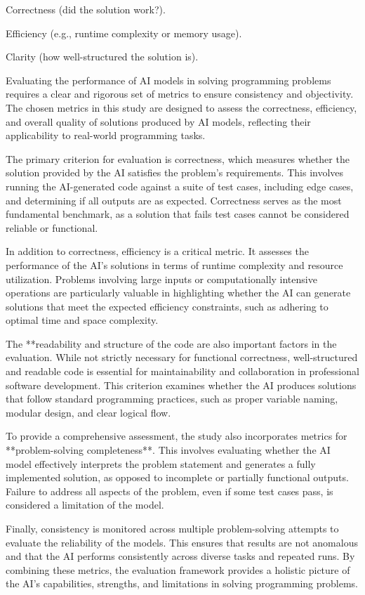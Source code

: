     Correctness (did the solution work?).

    Efficiency (e.g., runtime complexity or memory usage).

    Clarity (how well-structured the solution is).



Evaluating the performance of AI models in solving programming problems requires a clear and rigorous set of metrics to ensure consistency and objectivity. The chosen metrics in this study are designed to assess the correctness, efficiency, and overall quality of solutions produced by AI models, reflecting their applicability to real-world programming tasks.
    
The primary criterion for evaluation is correctness, which measures whether the solution provided by the AI satisfies the problem’s requirements. This involves running the AI-generated code against a suite of test cases, including edge cases, and determining if all outputs are as expected. Correctness serves as the most fundamental benchmark, as a solution that fails test cases cannot be considered reliable or functional.
    
In addition to correctness, efficiency is a critical metric. It assesses the performance of the AI’s solutions in terms of runtime complexity and resource utilization. Problems involving large inputs or computationally intensive operations are particularly valuable in highlighting whether the AI can generate solutions that meet the expected efficiency constraints, such as adhering to optimal time and space complexity.
    
The **readability and structure of the code are also important factors in the evaluation. While not strictly necessary for functional correctness, well-structured and readable code is essential for maintainability and collaboration in professional software development. This criterion examines whether the AI produces solutions that follow standard programming practices, such as proper variable naming, modular design, and clear logical flow.
    
To provide a comprehensive assessment, the study also incorporates metrics for **problem-solving completeness**. This involves evaluating whether the AI model effectively interprets the problem statement and generates a fully implemented solution, as opposed to incomplete or partially functional outputs. Failure to address all aspects of the problem, even if some test cases pass, is considered a limitation of the model.
    
Finally, consistency is monitored across multiple problem-solving attempts to evaluate the reliability of the models. This ensures that results are not anomalous and that the AI performs consistently across diverse tasks and repeated runs. By combining these metrics, the evaluation framework provides a holistic picture of the AI’s capabilities, strengths, and limitations in solving programming problems.
